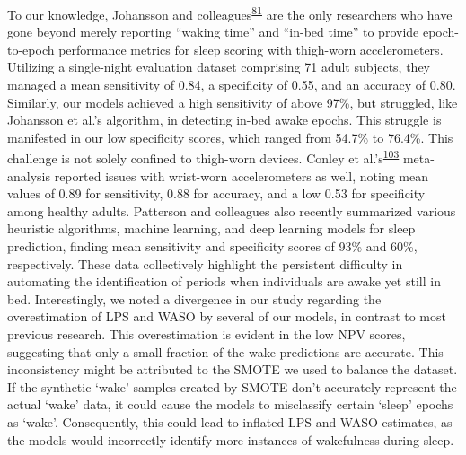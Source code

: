 \documentclass[
  10pt,
]{scrbook}
\begin{document}
To our knowledge, Johansson and
colleagues\textsuperscript{\protect\hyperlink{ref-johansson_development_2023}{81}}
are the only researchers who have gone beyond merely reporting ``waking
time'' and ``in-bed time'' to provide epoch-to-epoch performance metrics
for sleep scoring with thigh-worn accelerometers. Utilizing a
single-night evaluation dataset comprising 71 adult subjects, they
managed a mean sensitivity of 0.84, a specificity of 0.55, and an
accuracy of 0.80. Similarly, our models achieved a high sensitivity of
above 97\%, but struggled, like Johansson et al.'s algorithm, in
detecting in-bed awake epochs. This struggle is manifested in our low
specificity scores, which ranged from 54.7\% to 76.4\%. This challenge
is not solely confined to thigh-worn devices. Conley et
al.'s\textsuperscript{\protect\hyperlink{ref-conley_agreement_2019}{103}}
meta-analysis reported issues with wrist-worn accelerometers as well,
noting mean values of 0.89 for sensitivity, 0.88 for accuracy, and a low
0.53 for specificity among healthy adults. Patterson and colleagues also
recently summarized various heuristic algorithms, machine learning, and
deep learning models for sleep prediction, finding mean sensitivity and
specificity scores of 93\% and 60\%, respectively. These data
collectively highlight the persistent difficulty in automating the
identification of periods when individuals are awake yet still in bed.
Interestingly, we noted a divergence in our study regarding the
overestimation of LPS and WASO by several of our models, in contrast to
most previous research. This overestimation is evident in the low NPV
scores, suggesting that only a small fraction of the wake predictions
are accurate. This inconsistency might be attributed to the SMOTE we
used to balance the dataset. If the synthetic `wake' samples created by
SMOTE don't accurately represent the actual `wake' data, it could cause
the models to misclassify certain `sleep' epochs as `wake'.
Consequently, this could lead to inflated LPS and WASO estimates, as the
models would incorrectly identify more instances of wakefulness during
sleep.
\end{document}
